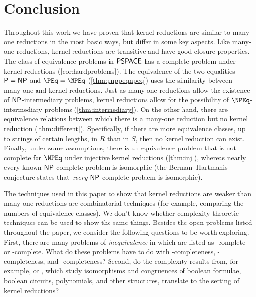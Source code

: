 \section{Conclusion}
%
Throughout this work we have proven that kernel reductions are similar to many-one reductions in the most basic ways, but differ in some key aspects.
Like many-one reductions, kernel reductions are transitive and have good closure properties.
The class of equivalence problems in ${\mathsf{PSPACE}}$ has a complete problem under kernel reductions (\autoref{cor:hardproblems}).
The equivalence of the two equalities ${\mathsf{P}} = {\mathsf{NP}}$ and $\PEq = \NPEq$ (\autoref{thm:pnppeqnpeq}) uses the similarity between many-one and kernel reductions.
Just as many-one reductions allow the existence of ${\mathsf{NP}}$-intermediary problems, kernel reductions allow for the possibility of $\NPEq$-intermediary problems (\autoref{thm:intermediary}).
On the other hand, there are equivalence relations between which there is a many-one reduction but no kernel reduction (\autoref{thm:different}).
Specifically, if there are more equivalence classes, up to strings of certain lengths, in $R$ than in $S$, then no kernel reduction can exist.
Finally, under some assumptions, there is an equivalence problem that is not complete for $\NPEq$ under injective kernel reductions (\autoref{thm:inj}), whereas nearly every known ${\mathsf{NP}}$-complete problem is isomorphic (the Berman--Hartmanis conjecture \autocite{bh77} states that \emph{every} ${\mathsf{NP}}$-complete problem is isomorphic).

The techniques used in this paper to show that kernel reductions are weaker than many-one reductions are combinatorial techniques (for example, comparing the numbers of equivalence classes).
We don't know whether complexity theoretic techniques can be used to show the same things.
Besides the open problems listed throughout the paper, we consider the following questions to be worth exploring.
First, there are many problems of \emph{inequivalence} in \autocite{gj79} which are listed as \NP-complete or \PSPACE-complete.
What do these problems have to do with \NPEq-completeness, \coNPEq-completeness, and \PSPACEEq-completeness?
Second, do the complexity results from, for example, \autocite{at96} or \autocite{rs11}, which study isomorphisms and congruences of boolean formulae, boolean circuits, polynomials, and other structures, translate to the setting of kernel reductions?
